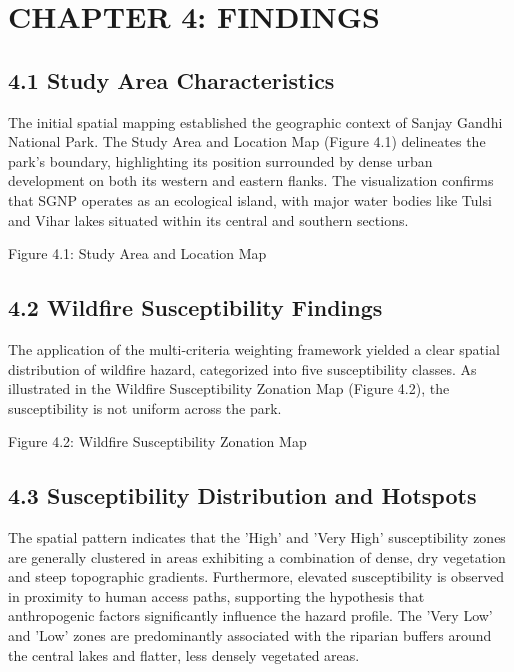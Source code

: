 \documentclass[12pt,a4paper]{article}
\begin{document}
\clearpage
\section*{CHAPTER 4: FINDINGS}


\subsection*{4.1 Study Area Characteristics}

The initial spatial mapping established the geographic context of Sanjay Gandhi National Park. The Study Area and Location Map (Figure 4.1) delineates the park's boundary, highlighting its position surrounded by dense urban development on both its western and eastern flanks. The visualization confirms that SGNP operates as an ecological island, with major water bodies like Tulsi and Vihar lakes situated within its central and southern sections.


Figure 4.1: Study Area and Location Map



\subsection*{4.2 Wildfire Susceptibility Findings}

The application of the multi-criteria weighting framework yielded a clear spatial distribution of wildfire hazard, categorized into five susceptibility classes. As illustrated in the Wildfire Susceptibility Zonation Map (Figure 4.2), the susceptibility is not uniform across the park.


Figure 4.2: Wildfire Susceptibility Zonation Map



\subsection*{4.3 Susceptibility Distribution and Hotspots}

The spatial pattern indicates that the 'High' and 'Very High' susceptibility zones are generally clustered in areas exhibiting a combination of dense, dry vegetation and steep topographic gradients. Furthermore, elevated susceptibility is observed in proximity to human access paths, supporting the hypothesis that anthropogenic factors significantly influence the hazard profile. The 'Very Low' and 'Low' zones are predominantly associated with the riparian buffers around the central lakes and flatter, less densely vegetated areas.
\end{document}
